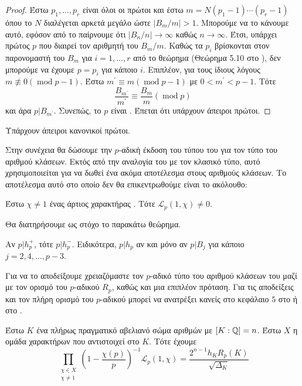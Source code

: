 \begin{proof} Έστω $p_1,\ldots,p_r$ είναι όλοι οι  πρώτοι και έστω $m=N(p_1-1)\cdots(p_r-1)$ όπου το $N$ διαλέγεται αρκετά 
	μεγάλο ώστε $|B_m/m|>1$. Μπορούμε να το κάνουμε αυτό, εφόσον από το \cite{Wash} παίρνουμε ότι $|B_n/n|\rightarrow \infty$ 
	καθώς $n\rightarrow \infty$. Έτσι, υπάρχει πρώτος $p$ που διαιρεί τον αριθμητή του $B_m/m$. Καθώς τα $p_i$ βρίσκονται 
	στον παρονομαστή του $B_m$ για $i=1,\ldots,r$ από το θεώρημα  (Θεώρημα 5.10 στο \cite{Wash}), δεν μπορούμε να έχουμε $p=p_i$ για κάποιο $i$. Επιπλέον, για τους ίδιους λόγους $m\not\equiv 0 (\operatorname{mod}p-1)$. Έστω $m^{\prime}\equiv m (\operatorname{mod}p-1)$ με $0<m^{\prime}<p-1$. Τότε 
	$$\frac{B_{m^{\prime}}}{m^{\prime}} \equiv \frac{B_m}{m} (\operatorname{mod}p)$$ και άρα $p|B_{m^{\prime}}$. Συνεπώς, το $p$ είναι . Έπεται ότι υπάρχουν άπειροι  πρώτοι.
\end{proof}

\begin{conj} Υπάρχουν άπειροι κανονικοί πρώτοι.
\end{conj}

\noindent Στην συνέχεια θα δώσουμε την $p$-αδική έκδοση του τύπου του  για τον τύπο του αριθμού κλάσεων. Εκτός 
από την αναλογία του με τον κλασικό τύπο, αυτό χρησιμοποιείται για να δωθεί ένα ακόμα αποτέλεσμα στους αριθμούς κλάσεων. 
Το αποτέλεσμα αυτό στο οποίο δεν θα επικεντρωθούμε είναι το ακόλουθο:

\begin{theorem} Έστω $\chi \neq 1$ ένας άρτιος χαρακτήρας . Τότε $\mathcal{L}_p(1,\chi) \neq 0$.
\end{theorem}

\noindent Θα διατηρήσουμε ως στόχο το παρακάτω θεώρημα.

\begin{theorem} \label{3.33}
	Αν $p|h^+_p$, τότε $p|h^-_p$. Ειδικότερα, $p|h_p$ αν και μόνο αν $p|B_j$ για κάποιο $j=2,4,\ldots, p-3$.
\end{theorem}


\noindent Για να το αποδείξουμε χρειαζόμαστε τον $p$-αδικό τύπο του αριθμού κλάσεων του  μαζί με τον ορισμό 
του $p$-αδικού  $R_p$, καθώς και μια επιπλέον πρόταση. Για τις αποδείξεις και τον πλήρη ορισμό του $p$-αδικού 
 μπορεί να ανατρέξει κανείς στο κεφάλαιο $5$ στο \cite{Wash} ή στο \cite{Milne1}.

\begin{theorem} Έστω $K$ ένα πλήρως πραγματικό αβελιανό σώμα αριθμών με $[K:\mathbb{Q}]=n$. Έστω $X$ η ομάδα χαρακτήρων που αντιστοιχεί στο $K$. Τότε έχουμε
	$$\prod\limits_{\substack{\chi \in X \\ \chi \neq 1}} \left(1-\frac{\chi(p)}{p}\right)^{-1} \mathcal{L}_p(1,\chi) = \frac{2^{n-1}h_K R_p(K)}{\sqrt{\Delta_K}}$$
\end{theorem}


